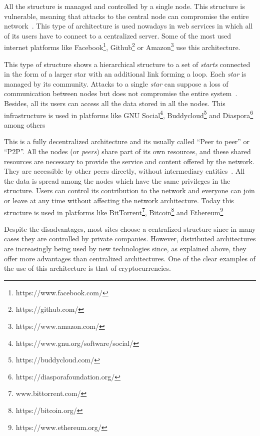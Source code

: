 \begin{itemize}
   All the structure is managed and controlled
  by a single node. This structure is vulnerable, meaning that attacks to the
  central node can compromise the entire network~\cite{baran1964distributed}.
  This type of architecture is used nowadays in web services in which all of its
  users have to connect to a centralized server. Some of the most used internet
  platforms like Facebook\footnote{https://www.facebook.com/},
  Github\footnote{https://github.com/} or
  Amazon\footnote{https://www.amazon.com/} use this architecture.

  
   This type of structure shows a hierarchical
  structure to a set of \emph{starts} connected in the form of a larger star
  with an additional link forming a loop. Each \emph{star} is managed by its
  community. Attacks to a single \emph{star} can suppose a loss of communication
  between nodes but does not compromise the entire
  system~\cite{baran1964distributed}. Besides, all its users can access all the
  data stored in all the nodes. This infrastructure is used in platforms like
  GNU Social\footnote{https://www.gnu.org/software/social/},
  Buddycloud\footnote{https://buddycloud.com/} and
  Diaspora\footnote{https://diasporafoundation.org/} among others

   This is a fully decentralized architecture
  and its usually called ``Peer to peer'' or ``P2P''. All the nodes (or
  \emph{peers}) share part of its own resources, and these shared resources are
  necessary to provide the service and content offered by the network. They are
  accessible by other peers directly, without intermediary
  entities~\cite{schollmeier2001definition}. All the data is spread among the
  nodes which have the same privileges in the structure. Users can control its
  contribution to the network and everyone can join or leave at any time without
  affecting the network architecture. Today this structure is used in platforms
  like BitTorrent\footnote{www.bittorrent.com/},
  Bitcoin\footnote{https://bitcoin.org/} and
  Ethereum\footnote{https://www.ethereum.org/}
\end{itemize}

Despite the disadvantages, most sites choose a centralized structure since in
many cases they are controlled by private companies. However, distributed
architectures are increasingly being used by new technologies since, as
explained above, they offer more advantages than centralized architectures. One
of the clear examples of the use of this architecture is that of
cryptocurrencies.

